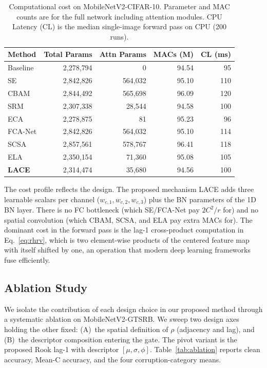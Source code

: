 \documentclass{bmvc2k}
\begin{document}
\begin{table}[t]
\centering
\caption{Computational cost on MobileNetV2-CIFAR-10. Parameter and MAC counts are for the full network including attention modules. CPU Latency (CL) is the median single-image forward pass on CPU (200 runs).}
\label{tab:cost}
\renewcommand{\arraystretch}{0.70}
\begin{tabular}{l rrrr}
\toprule
Method & Total Params & Attn Params & MACs (M) & CL (ms) \\
\midrule
Baseline & 2{,}278{,}794 & 0          & 94.54  & 95 \\
SE       & 2{,}842{,}826 & 564{,}032  & 95.10  & 110 \\
CBAM     & 2{,}844{,}492 & 565{,}698  & 96.09  & 120 \\
SRM      & 2{,}307{,}338 & 28{,}544   & 94.58  & 100 \\
ECA      & 2{,}278{,}875 & 81         & 95.23  & 96 \\
FCA-Net   & 2{,}842{,}826 & 564{,}032  & 95.10  & 114 \\
SCSA     & 2{,}857{,}561 & 578{,}767  & 96.41  & 118 \\
ELA      & 2{,}350{,}154 & 71{,}360   & 95.08  & 105 \\
\textbf{LACE} & 2{,}314{,}474 & 35{,}680 & 94.56 & 100 \\
\bottomrule
\end{tabular}
\end{table}

The cost profile reflects the design. The proposed mechanism LACE adds three learnable scalars per channel ($w_{c,1}, w_{c,2}, w_{c,3}$) plus the BN parameters of the 1D BN layer. There is no FC bottleneck (which SE/FCA-Net pay $2C^2/r$ for) and no spatial convolution (which CBAM, SCSA, and ELA pay extra MACs for). The dominant cost in the forward pass is the lag-1 cross-product computation in Eq.~\ref{eq:rhrv}, which is two element-wise products of the centered feature map with itself shifted by one, an operation that
modern deep learning frameworks fuse efficiently.

\subsection{Ablation Study}
\label{sec:ablation}

We isolate the contribution of each design choice in our proposed method through a systematic ablation on MobileNetV2-GTSRB. We sweep two design axes holding the other fixed: (A)~the spatial definition of $\rho$ (adjacency and lag), and (B)~the descriptor composition entering the gate. The pivot variant is the proposed Rook lag-1 with descriptor $[\mu, \sigma, \phi]$. Table~\ref{tab:ablation} reports clean accuracy, Mean-C accuracy, and the four corruption-category means.
\end{document}
